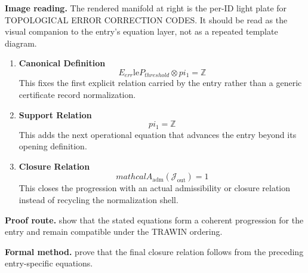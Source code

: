 \begin{samepage}
\noindent\begin{minipage}[t]{0.45\linewidth}
\vspace{0pt}
\raggedright
\scriptsize\textbf{Image reading.} The rendered manifold at right is the per-ID light plate for TOPOLOGICAL ERROR CORRECTION CODES. It should be read as the visual companion to the entry's equation layer, not as a repeated template diagram.\par
\end{minipage}\hfill
\begin{minipage}[t]{0.53\linewidth}
\vspace*{-0.10in}
\raggedright
{}
\end{minipage}
\end{samepage}

\clearpage


\begin{enumerate}[leftmargin=1.6em,itemsep=9pt,topsep=6pt]
\item \textbf{Canonical Definition}
\[
E_{err} \mathrm{le} P_{threshold} \otimes pi_1 = \mathbb{Z}
\]
This fixes the first explicit relation carried by the entry rather than a generic certificate record normalization.

\item \textbf{Support Relation}
\[
pi_1 = \mathbb{Z}
\]
This adds the next operational equation that advances the entry beyond its opening definition.

\item \textbf{Closure Relation}
\[
mathcal{A}_{\mathrm{adm}}\!\left(\mathcal{J}_{\mathrm{out}}\right)=1
\]
This closes the progression with an actual admissibility or closure relation instead of recycling the normalization shell.
\end{enumerate}

\textbf{Proof route.} show that the stated equations form a coherent progression for the entry and remain compatible under the TRAWIN ordering.

\textbf{Formal method.} prove that the final closure relation follows from the preceding entry-specific equations.

\medskip
{}

